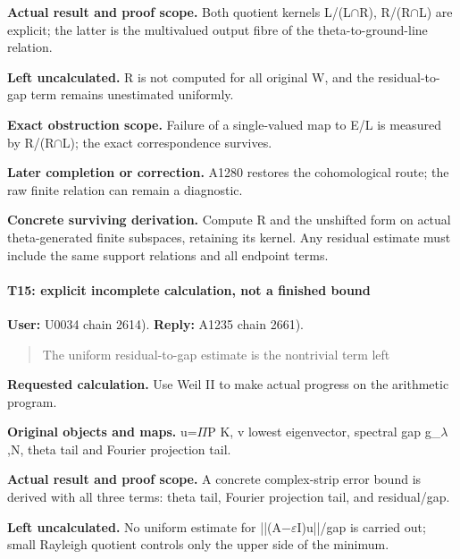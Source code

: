 \textbf{Actual result and proof scope.} Both quotient kernels
L/(L\allowbreak{}\ensuremath{∩}\allowbreak{}R),
R/(R\allowbreak{}\ensuremath{∩}\allowbreak{}L) are explicit; the latter
is the multivalued output fibre of the theta-to-ground-line relation.

\textbf{Left uncalculated.} R is not computed for all original W, and
the residual-to-gap term remains unestimated uniformly.

\textbf{Exact obstruction scope.} Failure of a single-valued map to E/L
is measured by R/(R\allowbreak{}\ensuremath{∩}\allowbreak{}L); the exact
correspondence survives.

\textbf{Later completion or correction.} A1280 restores the
cohomological route; the raw finite relation can remain a diagnostic.

\textbf{Concrete surviving derivation.} Compute R and the unshifted form
on actual theta-generated finite subspaces, retaining its kernel. Any
residual estimate must include the same support relations and all
endpoint terms.

\paragraph{T15: explicit incomplete calculation, not a finished
bound}\label{t15-explicit-incomplete-calculation-not-a-finished-bound}

\textbf{User:} U0034
\protect{} chain 2614).
\textbf{Reply:} A1235
\protect{} chain 2661).

\begin{quote}
The uniform residual-to-gap estimate is the nontrivial term left
\end{quote}

\textbf{Requested calculation.} Use Weil II to make actual progress on
the arithmetic program.

\textbf{Original objects and maps.}
u=\allowbreak{}\ensuremath{Π}\allowbreak{}P K, v lowest eigenvector,
spectral gap g\_\allowbreak{}\ensuremath{λ}\allowbreak{},N, theta tail
and Fourier projection tail.

\textbf{Actual result and proof scope.} A concrete complex-strip error
bound is derived with all three terms: theta tail, Fourier projection
tail, and residual/gap.

\textbf{Left uncalculated.} No uniform estimate for
||(A\allowbreak{}\ensuremath{−}\allowbreak{}\allowbreak{}\ensuremath{ε}\allowbreak{}I)u||/gap
is carried out; small Rayleigh quotient controls only the upper side of
the minimum.

